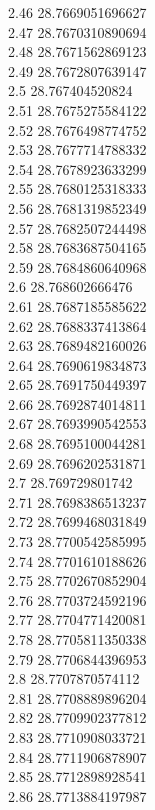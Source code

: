 {2.46	28.7669051696627\\
2.47	28.7670310890694\\
2.48	28.7671562869123\\
2.49	28.7672807639147\\
2.5	28.767404520824\\
2.51	28.7675275584122\\
2.52	28.7676498774752\\
2.53	28.7677714788332\\
2.54	28.7678923633299\\
2.55	28.7680125318333\\
2.56	28.7681319852349\\
2.57	28.7682507244498\\
2.58	28.7683687504165\\
2.59	28.7684860640968\\
2.6	28.768602666476\\
2.61	28.7687185585622\\
2.62	28.7688337413864\\
2.63	28.7689482160026\\
2.64	28.7690619834873\\
2.65	28.7691750449397\\
2.66	28.7692874014811\\
2.67	28.7693990542553\\
2.68	28.7695100044281\\
2.69	28.7696202531871\\
2.7	28.769729801742\\
2.71	28.7698386513237\\
2.72	28.7699468031849\\
2.73	28.7700542585995\\
2.74	28.7701610188626\\
2.75	28.7702670852904\\
2.76	28.7703724592196\\
2.77	28.7704771420081\\
2.78	28.7705811350338\\
2.79	28.7706844396953\\
2.8	28.7707870574112\\
2.81	28.7708889896204\\
2.82	28.7709902377812\\
2.83	28.7710908033721\\
2.84	28.7711906878907\\
2.85	28.7712898928541\\
2.86	28.7713884197987\\
}
